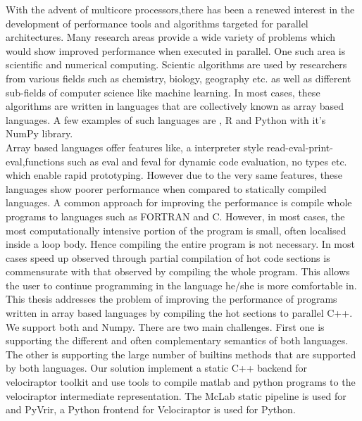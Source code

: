 With the advent of multicore processors,there has been a renewed interest in the development of performance tools and algorithms targeted for parallel architectures. Many research areas  provide a wide variety of problems which would show improved performance when executed in parallel. One such area is scientific and numerical computing. Scientic algorithms are used by researchers from various fields such as chemistry, biology, geography etc. as well as different sub-fields of computer science like machine learning. In most cases, these algorithms are written in languages  that are collectively known as  array based languages. A few examples of such languages are \matlab\cite{matlab}, R and Python with it's NumPy library.\\
Array based languages offer features like, a interpreter style read-eval-print-eval,functions such as eval and feval for dynamic code evaluation,  no types etc. which enable rapid prototyping. However due to the very same features, these languages show poorer performance when compared to statically compiled languages. A common approach for improving the performance is compile whole programs to languages such as {\sc FORTRAN} and C. However, in most cases, the most computationally intensive portion of the program is small, often localised inside a loop body. Hence compiling the entire program is not necessary. In most cases speed up observed through partial compilation of hot code sections is commensurate with that observed by compiling the whole program. This allows the user to continue programming in the language he/she is more comfortable in.\\
This thesis addresses the problem of improving the performance of programs written in array based languages by compiling the hot sections to parallel C++. We support both \matlab and Numpy. There are two main challenges. First one is supporting the different and often complementary semantics of both languages. The other is supporting the large number of builtins methods that are supported by both languages.
Our solution implement a static C++ backend for velociraptor toolkit and use tools to compile matlab and python programs to the velociraptor intermediate representation. The McLab static pipeline is used for \matlab and PyVrir, a Python frontend for Velociraptor is used for Python. 
